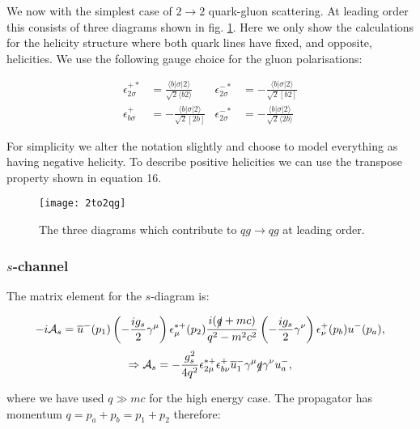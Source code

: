		We now with the simplest case of $2\rightarrow 2$ quark-gluon scattering.  At leading order this
		consists of three diagrams shown in fig. \ref{fig:TwoToTwo}.  Here we only show the calculations
		for the helicity structure where both quark lines have fixed, and opposite, helicities.  We use
		the following gauge choice for the gluon polarisations:

		\begin{align}
		\epsilon^{+*}_{2\sigma}&=\frac{\langle b|\sigma|2\rangle}{\sqrt{2}\langle b2\rangle} & \epsilon^{-*}_{2\sigma} &= -\frac{\langle b|\sigma|2\rangle}{\sqrt{2}[b2]} \\
		\epsilon^{+}_{b\sigma}&=-\frac{\langle b|\sigma|2\rangle}{\sqrt{2}[2b]} & \epsilon^{-*}_{2\sigma} &= -\frac{\langle b|\sigma|2\rangle}{\sqrt{2}\langle 2b\rangle}
		\end{align}

		For simplicity we alter the notation slightly and choose to model everything as having negative helicity.  To describe positive helicities we can use the transpose property shown in equation 16.

		\begin{figure}
			\begin{center}
			\texttt{[image: 2to2qg]}
			\caption{The three diagrams which contribute to $qg\rightarrow qg$ at leading order.}
			\label{fig:TwoToTwo}
			\end{center}
		\end{figure}

		\subsubsection{$s$-channel}

			The matrix element for the $s$-diagram is:

			\begin{equation}
			-i\mathcal{A}_s=\overline{u}^-(p_1)\left(-\frac{ig_s}{2}\gamma^\mu\right)\epsilon_\mu^{*+}(p_2)\frac{i(\slashed q+mc)}{q^2-m^2c^2}\left(-\frac{ig_s}{2}\gamma^\nu\right)\epsilon^+_\nu(p_b)u^-(p_a),
			\end{equation}
			\begin{equation*}
			\Rightarrow \mathcal{A}_s=-\frac{g^2_s}{4q^2}\epsilon^{*+}_{2\mu}\epsilon^+_{b\nu}\overline{u}^-_1\gamma^\mu\slashed q\gamma^\nu u^-_a,
			\end{equation*}

			where we have used $q\gg mc$ for the high energy case.  The propagator has momentum $q=p_a+p_b=p_1+p_2$ therefore:


